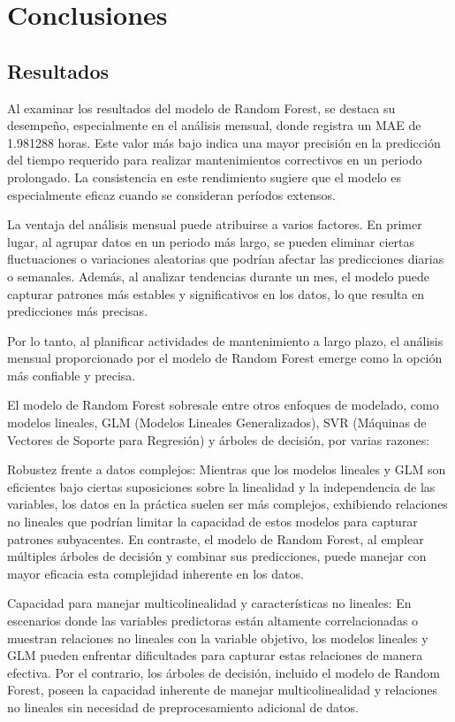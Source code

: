 \documentclass[
  11pt,
  bookmarksnumbered]{article}
\begin{document}
\newpage

\hypertarget{conclusiones}{%
\section{Conclusiones}\label{conclusiones}}

\hypertarget{resultados}{%
\subsection{Resultados}\label{resultados}}

Al examinar los resultados del modelo de Random Forest, se destaca su desempeño, especialmente en el análisis mensual, donde registra un MAE de 1.981288 horas.
Este valor más bajo indica una mayor precisión en la predicción del tiempo requerido para realizar mantenimientos correctivos en un periodo prolongado.
La consistencia en este rendimiento sugiere que el modelo es especialmente eficaz cuando se consideran períodos extensos.

La ventaja del análisis mensual puede atribuirse a varios factores.
En primer lugar, al agrupar datos en un periodo más largo, se pueden eliminar ciertas fluctuaciones o variaciones aleatorias que podrían afectar las predicciones diarias o semanales.
Además, al analizar tendencias durante un mes, el modelo puede capturar patrones más estables y significativos en los datos, lo que resulta en predicciones más precisas.

Por lo tanto, al planificar actividades de mantenimiento a largo plazo, el análisis mensual proporcionado por el modelo de Random Forest emerge como la opción más confiable y precisa.

El modelo de Random Forest sobresale entre otros enfoques de modelado, como modelos lineales, GLM (Modelos Lineales Generalizados), SVR (Máquinas de Vectores de Soporte para Regresión) y árboles de decisión, por varias razones:

Robustez frente a datos complejos: Mientras que los modelos lineales y GLM son eficientes bajo ciertas suposiciones sobre la linealidad y la independencia de las variables, los datos en la práctica suelen ser más complejos, exhibiendo relaciones no lineales que podrían limitar la capacidad de estos modelos para capturar patrones subyacentes.
En contraste, el modelo de Random Forest, al emplear múltiples árboles de decisión y combinar sus predicciones, puede manejar con mayor eficacia esta complejidad inherente en los datos.

Capacidad para manejar multicolinealidad y características no lineales: En escenarios donde las variables predictoras están altamente correlacionadas o muestran relaciones no lineales con la variable objetivo, los modelos lineales y GLM pueden enfrentar dificultades para capturar estas relaciones de manera efectiva.
Por el contrario, los árboles de decisión, incluido el modelo de Random Forest, poseen la capacidad inherente de manejar multicolinealidad y relaciones no lineales sin necesidad de preprocesamiento adicional de datos.
\end{document}

